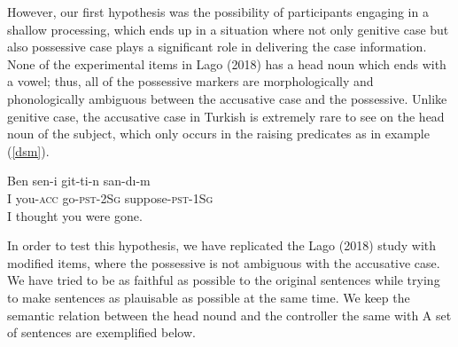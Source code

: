 \documentclass[11pt,a4paper]{article}
\begin{document}
However, our first hypothesis was the possibility of participants
engaging in a shallow processing, which ends up in a situation where not
only genitive case but also possessive case plays a significant role in
delivering the case information. None of the experimental items in Lago
(2018) has a head noun which ends with a vowel; thus, all of the
possessive markers are morphologically and phonologically ambiguous
between the accusative case and the possessive. Unlike genitive case,
the accusative case in Turkish is extremely rare to see on the head noun
of the subject, which only occurs in the raising predicates as in
example (\ref{dsm}).

\begin{exe}
\ex \label{dsm}
\gll Ben sen-i git-ti-n san-d{\i}-m\\
I you-\textsc{acc} go-\textsc{pst}-\textsc{2Sg} suppose-\textsc{pst}-\textsc{1Sg}\\
\glt I thought you were gone.
\end{exe}

In order to test this hypothesis, we have replicated the Lago (2018)
study with modified items, where the possessive is not ambiguous with
the accusative case. We have tried to be as faithful as possible to the
original sentences while trying to make sentences as plauisable as
possible at the same time. We keep the semantic relation between the
head nound and the controller the same with A set of sentences are
exemplified below.
\end{document}
